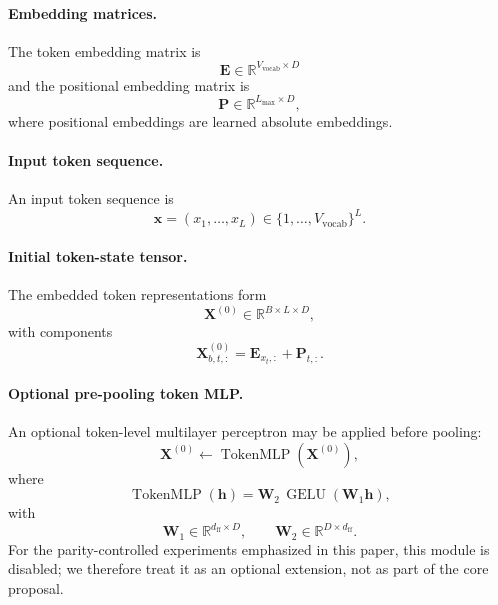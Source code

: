 \documentclass{article}
\theoremstyle{plain}
\theoremstyle{definition}
\theoremstyle{remark}
\begin{document}
\paragraph{Embedding matrices.}
The token embedding matrix is
\begin{equation}
\label{eq:token-embedding}
\mathbf{E} \in \mathbb{R}^{V_{\mathrm{vocab}} \times D}
\end{equation}
and the positional embedding matrix is
\begin{equation}
\label{eq:pos-embedding}
\mathbf{P} \in \mathbb{R}^{L_{\max} \times D},
\end{equation}
where positional embeddings are learned absolute embeddings.

\paragraph{Input token sequence.}
An input token sequence is
\begin{equation}
\label{eq:input-sequence}
\mathbf{x}=(x_1,\dots,x_L)\in\{1,\dots,V_{\mathrm{vocab}}\}^L.
\end{equation}

\paragraph{Initial token-state tensor.}
The embedded token representations form
\begin{equation}
\label{eq:token-states}
\mathbf{X}^{(0)}\in\mathbb{R}^{B\times L\times D},
\end{equation}
with components
\begin{equation}
\label{eq:token-embedding-lookup}
\mathbf{X}^{(0)}_{b,t,:}=\mathbf{E}_{x_t,:}+\mathbf{P}_{t,:}.
\end{equation}

\paragraph{Optional pre-pooling token MLP.}
An optional token-level multilayer perceptron may be applied before pooling:
\begin{equation}
\label{eq:token-mlp}
\mathbf{X}^{(0)}\leftarrow \operatorname{TokenMLP}(\mathbf{X}^{(0)}),
\end{equation}
where
\begin{equation}
\label{eq:token-mlp-def}
\operatorname{TokenMLP}(\mathbf{h})=\mathbf{W}_2\,\operatorname{GELU}(\mathbf{W}_1\mathbf{h}),
\end{equation}
with
\begin{equation}
\mathbf{W}_1\in\mathbb{R}^{d_{\mathrm{ff}}\times D},
\qquad
\mathbf{W}_2\in\mathbb{R}^{D\times d_{\mathrm{ff}}}.
\end{equation}
For the parity-controlled experiments emphasized in this paper, this module is disabled; we therefore treat it as an optional extension, not as part of the core proposal.
\end{document}
